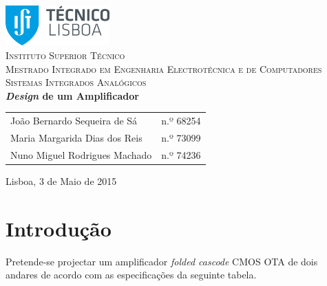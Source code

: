 \documentclass[11pt]{article}
\numberwithin{equation}{section}
\begin{document}
\begin{titlepage}
\begin{center}

\hfill \break
\hfill \break

\includegraphics[width=0.3\textwidth]{./logo}~\\[1cm]

\textsc{\LARGE Instituto Superior Técnico}\\[0.25cm]
\textsc{\Large Mestrado Integrado em Engenharia Electrotécnica e de Computadores}\\[1.8cm]
\textsc{\huge Sistemas Integrados Analógicos}\\[0.25cm]

{\huge \bfseries \textit{Design} de um Amplificador \\[1cm]}

\begin{tabular}{ l l }
João Bernardo Sequeira de Sá & \hspace{2mm} n.º 68254 \\
Maria Margarida Dias dos Reis & \hspace{2mm} n.º 73099 \\
Nuno Miguel Rodrigues Machado & \hspace{2mm} n.º 74236
\end{tabular}

\vfill

{\large Lisboa, 3 de Maio de 2015} 

\end{center}
\end{titlepage}

\clearpage

\tableofcontents
\pagebreak

\clearpage
{}

\section{Introdução}

Pretende-se projectar um amplificador \textit{folded cascode} CMOS OTA de dois andares de acordo com as especificações da seguinte tabela.
\end{document}
